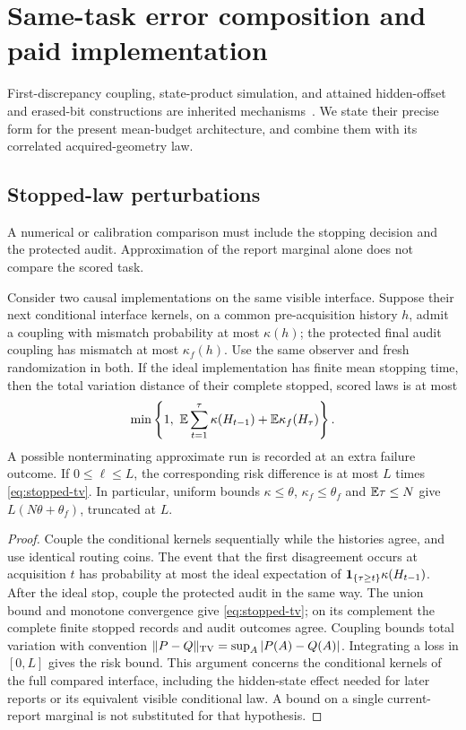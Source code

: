 \section{Same-task error composition and paid implementation}\label{sec:errors}
First-discrepancy coupling, state-product simulation, and attained hidden-offset and erased-bit constructions are inherited mechanisms~\cite{GTFStopped,GTFBayes}. We state their precise form for the present mean-budget architecture, and combine them with its correlated acquired-geometry law.
\subsection{Stopped-law perturbations}
A numerical or calibration comparison must include the stopping decision and the protected audit. Approximation of the report marginal alone does not compare the scored task.

\begin{proposition}\label{prop:stopped-error}
Consider two causal implementations on the same visible interface. Suppose their next conditional interface kernels, on a common pre-acquisition history $h$, admit a coupling with mismatch probability at most $\kappa(h)$; the protected final audit coupling has mismatch at most $\kappa_f(h)$. Use the same observer and fresh randomization in both. If the ideal implementation has finite mean stopping time, then the total variation distance of their complete stopped, scored laws is at most
\begin{equation}\label{eq:stopped-tv}
 \min\left\{1,\ \mathbb E\sum_{t=1}^{\tau}\kappa(H_{t-1})
                    +\mathbb E\kappa_f(H_\tau)\right\}.
\end{equation}
A possible nonterminating approximate run is recorded at an extra failure outcome. If $0\le\ell\le L$, the corresponding risk difference is at most $L$ times \eqref{eq:stopped-tv}. In particular, uniform bounds $\kappa\le\theta$, $\kappa_f\le\theta_f$ and $\mathbb E\tau\le N$ give $L(N\theta+\theta_f)$, truncated at $L$.
\end{proposition}
\begin{proof}
Couple the conditional kernels sequentially while the histories agree, and use identical routing coins. The event that the first disagreement occurs at acquisition $t$ has probability at most the ideal expectation of $\mathbf 1_{\{\tau\ge t\}}\kappa(H_{t-1})$. After the ideal stop, couple the protected audit in the same way. The union bound and monotone convergence give \eqref{eq:stopped-tv}; on its complement the complete finite stopped records and audit outcomes agree. Coupling bounds total variation with convention $\lVert P-Q\rVert_{\mathrm{TV}}=\sup_A|P(A)-Q(A)|$. Integrating a loss in $[0,L]$ gives the risk bound. This argument concerns the conditional kernels of the full compared interface, including the hidden-state effect needed for later reports or its equivalent visible conditional law. A bound on a single current-report marginal is not substituted for that hypothesis.
\end{proof}

